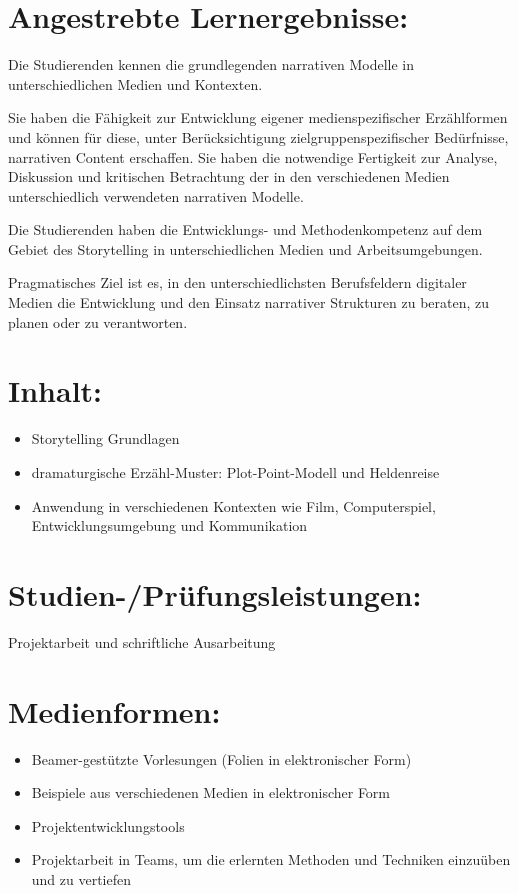 \section*{Angestrebte
Lernergebnisse:}\label{angestrebte-lernergebnisse-23}

Die Studierenden kennen die grundlegenden narrativen Modelle in
unterschiedlichen Medien und Kontexten.

Sie haben die Fähigkeit zur Entwicklung eigener medienspezifischer
Erzählformen und können für diese, unter Berücksichtigung
zielgruppenspezifischer Bedürfnisse, narrativen Content erschaffen. Sie
haben die notwendige Fertigkeit zur Analyse, Diskussion und kritischen
Betrachtung der in den verschiedenen Medien unterschiedlich verwendeten
narrativen Modelle.

Die Studierenden haben die Entwicklungs- und Methodenkompetenz auf dem
Gebiet des Storytelling in unterschiedlichen Medien und
Arbeitsumgebungen.

Pragmatisches Ziel ist es, in den unterschiedlichsten Berufsfeldern
digitaler Medien die Entwicklung und den Einsatz narrativer Strukturen
zu beraten, zu planen oder zu verantworten.

\section*{Inhalt:}\label{inhalt-23}

\begin{itemize}
\item
  Storytelling Grundlagen
\item
  dramaturgische Erzähl-Muster: Plot-Point-Modell und Heldenreise
\item
  Anwendung in verschiedenen Kontexten wie Film, Computerspiel,
  Entwicklungsumgebung und Kommunikation
\end{itemize}

\section*{Studien-/Prüfungsleistungen:}\label{studien-pruxfcfungsleistungen-23}

Projektarbeit und schriftliche Ausarbeitung

\section*{Medienformen:}\label{medienformen-23}

\begin{itemize}
\item
  Beamer-gestützte Vorlesungen (Folien in elektronischer Form)
\item
  Beispiele aus verschiedenen Medien in elektronischer Form
\item
  Projektentwicklungstools
\item
  Projektarbeit in Teams, um die erlernten Methoden und Techniken
  einzuüben und zu vertiefen
\end{itemize}

